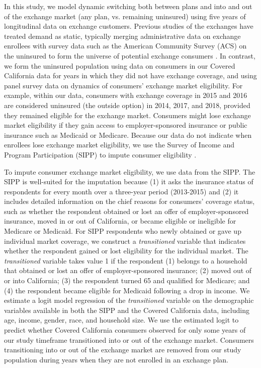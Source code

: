 \documentclass[12pt]{article}
\begin{document}
In this study, we model dynamic switching both between plans and into and out of the exchange market (any plan, vs. remaining uninsured) using five years of longitudinal data on exchange customers. Previous studies of the exchanges have treated demand as static, typically merging administrative data on exchange enrollees with survey data such as the American Community Survey (ACS) on the uninsured  to form the universe of potential exchange consumers \citep{Tebaldi2020,Domurat2017,saltzman2019}. In contrast, we form the uninsured population using data on consumers in our Covered California data for years in which they did not have exchange coverage, and using panel survey data on dynamics of consumers' exchange market eligibility. For example, within our data, consumers with exchange coverage in 2015 and 2016 are considered uninsured (the outside option) in 2014, 2017, and 2018, provided they remained eligible for the exchange market. Consumers might lose exchange market eligibility if they gain access to employer-sponsored insurance or public insurance such as Medicaid or Medicare. Because our data do not indicate when enrollees lose exchange market eligibility, we use the Survey of Income and Program Participation (SIPP) to impute consumer eligibility \citep{SIPP2019}.
	
To impute consumer exchange market eligibility, we use data from the SIPP. The SIPP is well-suited for the imputation because (1) it asks the insurance status of respondents for every month over a three-year period (2013-2015) and (2) it includes detailed information on the chief reasons for consumers' coverage status, such as whether the respondent obtained or lost an offer of employer-sponsored insurance, moved in or out of California, or became eligible or ineligible for Medicare or Medicaid. For SIPP respondents who newly obtained or gave up individual market coverage, we construct a \textit{transitioned} variable that indicates whether the respondent gained or lost eligibility for the individual market. The \textit{transitioned} variable takes value 1 if the respondent (1) belongs to a household that obtained or lost an offer of employer-sponsored insurance; (2) moved out of or into California; (3) the respondent turned 65 and qualified for Medicare; and (4) the respondent became eligible for Medicaid following a drop in income. We estimate a logit model regression of the \textit{transitioned} variable on the demographic variables available in both the SIPP and the Covered California data, including age, income, gender, race, and household size. We use the estimated logit to predict whether Covered California consumers observed for only some years of our study timeframe transitioned into or out of the exchange market. Consumers transitioning into or out of the exchange market are removed from our study population during years when they are not enrolled in an exchange plan. 
\end{document}
